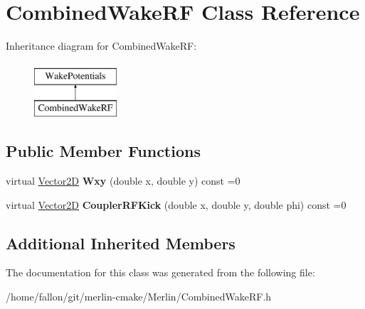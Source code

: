 \hypertarget{classCombinedWakeRF}{}\section{Combined\+Wake\+RF Class Reference}
\label{classCombinedWakeRF}
Inheritance diagram for Combined\+Wake\+RF\+:\begin{figure}[H]
\begin{center}
\leavevmode
\includegraphics[height=2.000000cm]{classCombinedWakeRF}
\end{center}
\end{figure}
\subsection*{Public Member Functions}
\begin{DoxyCompactItemize}
\item 
\mbox{\label{classCombinedWakeRF_a3251b2e49e253d5e282e8db29f93672f}} 
virtual \hyperlink{classTVec2D}{Vector2D} {\bfseries Wxy} (double x, double y) const =0
\item 
\mbox{\label{classCombinedWakeRF_a40c2e3fc3c8df751e1f78dc9dbadf224}} 
virtual \hyperlink{classTVec2D}{Vector2D} {\bfseries Coupler\+R\+F\+Kick} (double x, double y, double phi) const =0
\end{DoxyCompactItemize}
\subsection*{Additional Inherited Members}


The documentation for this class was generated from the following file\+:\begin{DoxyCompactItemize}
\item 
/home/fallon/git/merlin-\/cmake/\+Merlin/Combined\+Wake\+R\+F.\+h\end{DoxyCompactItemize}
